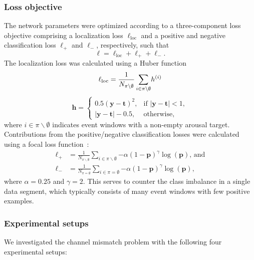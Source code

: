 \subsubsection{Loss objective}
The network parameters were optimized according to a three-component loss objective comprising a localization loss \( \ell_{\mathrm{loc}} \) and a positive and negative classification loss $\ell_{+}$ and $\ell_{-}$, respectively, such that
\begin{equation}\label{eq:paperv-loss}
    \ell = \ell_{\mathrm{loc}} + \ell_{+} + \ell_{-}.
\end{equation}
The localization loss was calculated using a Huber function
\begin{equation}
    \ell_{\mathrm{loc}} = \frac{1}{N_{\pi \backslash \emptyset}} \sum_{i \in \pi \backslash \emptyset}\!{h^{(i)}} \\
\end{equation} 
\begin{equation}
    \mathbf{h} =
    \begin{cases}
        0.5 \! \left( \mathbf{y} - \mathbf{t} \right)^2, & \text{if } \lvert \mathbf{y} - \mathbf{t} \rvert < 1, \\
        \lvert \mathbf{y} - \mathbf{t} \rvert - 0.5, & \text{otherwise,}
    \end{cases}
\end{equation}
where $i \in \pi \backslash \emptyset$ indicates event windows with a non-empty arousal target.
Contributions from the positive/negative classification losses were calculated using a focal loss function~\cite{Lin2020}:
\begin{align}
    \ell_{+} &= \frac{1}{N_{\pi \backslash \emptyset}} \sum_{i \in \pi \backslash \emptyset}\!{-\alpha \left( 1 - \mathbf{p} \right)^{\gamma}\log \left( \mathbf{p} \right)}, \, \text{and} \\
    \ell_{-} &= \frac{1}{N_{\pi = \emptyset}} \sum_{i \in \pi = \emptyset}\!{-\alpha \left( 1 - \mathbf{p} \right)^{\gamma}\log \left( \mathbf{p} \right)},
\end{align}
where $\alpha=0.25$ and $\gamma=2$.
This serves to counter the class imbalance in a single data segment, which typically consists of many event windows with few positive examples.

\subsubsection{Experimental setups}
We investigated the channel mismatch problem with the following four experimental setups:

